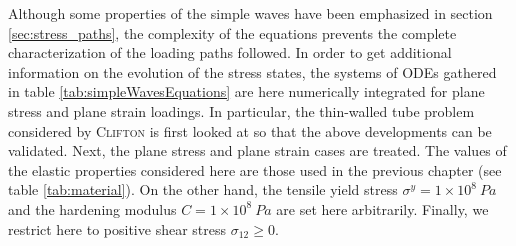 Although some properties of the simple waves have been emphasized in section \ref{sec:stress_paths}, the complexity of the equations prevents the complete characterization of the loading paths followed.
In order to get additional information on the evolution of the stress states, the systems of ODEs gathered in table \ref{tab:simpleWavesEquations} are here numerically integrated for plane stress and plane strain loadings. %
In particular, the thin-walled tube problem considered by \textsc{Clifton} \cite{Clifton} is first looked at so that the above developments can be validated.
Next, the plane stress and plane strain cases are treated.
The values of the elastic properties considered here are those used in the previous chapter (see table \ref{tab:material}).
On the other hand, the tensile yield stress $\sigma^y=1 \times 10^{8} \: Pa$ and the hardening modulus $C=1\times10^8 \: Pa$ are set here arbitrarily.
Finally, we restrict here to positive shear stress $\sigma_{12}\geq 0$.
